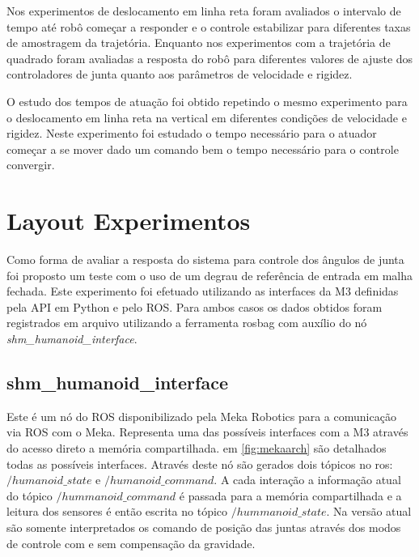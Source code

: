 Nos experimentos de deslocamento em linha reta foram avaliados o intervalo de tempo até robô começar a responder e o controle estabilizar para diferentes taxas de amostragem da trajetória. Enquanto nos experimentos com a trajetória de quadrado foram avaliadas a resposta do robô para diferentes valores de ajuste dos controladores de junta quanto aos parâmetros de velocidade e rigidez.


O estudo dos tempos de atuação foi obtido repetindo o mesmo experimento para o deslocamento em linha reta na vertical em diferentes condições de velocidade e rigidez. Neste experimento foi estudado o tempo necessário para o atuador começar a se mover dado um comando bem o tempo necessário para o controle convergir.



\section{Layout Experimentos}

Como forma de avaliar a resposta do sistema para controle dos ângulos de junta foi proposto um teste com o uso de um degrau de referência de entrada em malha fechada. Este experimento foi efetuado utilizando as interfaces da M3 definidas pela API em Python e pelo ROS. Para ambos casos os dados obtidos foram registrados em arquivo utilizando a ferramenta rosbag com auxílio do nó \textit{shm\_humanoid\_interface}.



\subsection{shm\_humanoid\_interface}

Este é um nó do ROS disponibilizado pela Meka Robotics para a comunicação via ROS com o Meka. Representa uma das possíveis interfaces com a M3 através do acesso direto a memória compartilhada. em \ref{fig:mekaarch} são detalhados todas as possíveis interfaces. Através deste nó são gerados dois tópicos no ros: $/humanoid\_state$ e $/humanoid\_command$. A cada interação a informação atual do tópico $/hummanoid\_command$ é passada para a memória compartilhada e a leitura dos sensores é então escrita no tópico $/hummanoid\_state$. Na versão atual são somente interpretados os comando de posição das juntas através dos modos de controle com e sem compensação da gravidade.

